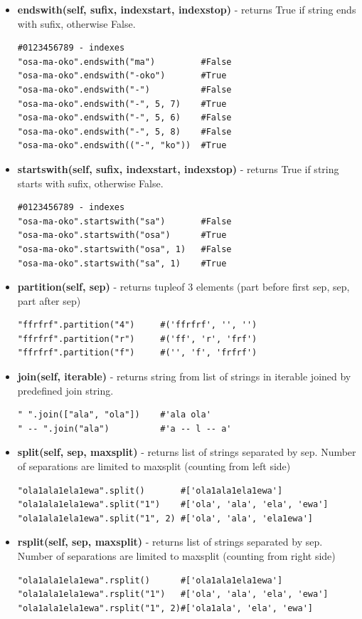 \documentclass{article}
\begin{document}
\begin{itemize}
\item \textbf{endswith(self, sufix, indexstart, indexstop)} - returns True if string ends with sufix, otherwise False.
\begin{lstlisting}[style=pystyle]
#0123456789 - indexes
"osa-ma-oko".endswith("ma") 		#False
"osa-ma-oko".endswith("-oko") 		#True
"osa-ma-oko".endswith("-") 			#False
"osa-ma-oko".endswith("-", 5, 7) 	#True
"osa-ma-oko".endswith("-", 5, 6) 	#False
"osa-ma-oko".endswith("-", 5, 8) 	#False
"osa-ma-oko".endswith(("-", "ko")) 	#True
\end{lstlisting}

\item \textbf{startswith(self, sufix, indexstart, indexstop)} - returns True if string starts with sufix, otherwise False.
\begin{lstlisting}[style=pystyle]
#0123456789 - indexes
"osa-ma-oko".startswith("sa") 		#False
"osa-ma-oko".startswith("osa") 		#True
"osa-ma-oko".startswith("osa", 1) 	#False
"osa-ma-oko".startswith("sa", 1) 	#True
\end{lstlisting}

\item \textbf{partition(self, sep)} - returns tupleof 3 elements (part before first sep, sep, part after sep)
\begin{lstlisting}[style=pystyle]
"ffrfrf".partition("4")		#('ffrfrf', '', '')
"ffrfrf".partition("r")		#('ff', 'r', 'frf')
"ffrfrf".partition("f")		#('', 'f', 'frfrf')
\end{lstlisting}

\item \textbf{join(self, iterable)} - returns string from list of strings in iterable joined by predefined join string.
\begin{lstlisting}[style=pystyle]
" ".join(["ala", "ola"])	#'ala ola'
" -- ".join("ala")			#'a -- l -- a'
\end{lstlisting}

\item \textbf{split(self, sep, maxsplit)} - returns list of strings separated by sep. Number of separations are limited to maxsplit (counting from left side)
\begin{lstlisting}[style=pystyle]
"ola1ala1ela1ewa".split()		#['ola1ala1ela1ewa']
"ola1ala1ela1ewa".split("1")	#['ola', 'ala', 'ela', 'ewa']
"ola1ala1ela1ewa".split("1", 2)	#['ola', 'ala', 'ela1ewa']
\end{lstlisting}

\item \textbf{rsplit(self, sep, maxsplit)} - returns list of strings separated by sep. Number of separations are limited to maxsplit (counting from right side)
\begin{lstlisting}[style=pystyle]
"ola1ala1ela1ewa".rsplit()		#['ola1ala1ela1ewa']
"ola1ala1ela1ewa".rsplit("1")	#['ola', 'ala', 'ela', 'ewa']
"ola1ala1ela1ewa".rsplit("1", 2)#['ola1ala', 'ela', 'ewa']
\end{lstlisting}


\end{itemize}
\end{document}
